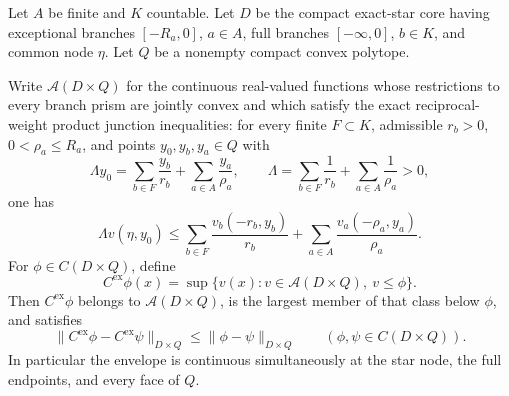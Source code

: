\begin{lemma}
\label{lem:p071-exact-star-polyhedral-envelope}
Let \(A\) be finite and \(K\) countable.  Let \(D\) be the compact exact-star
core having exceptional branches \([-R_a,0]\), \(a\in A\), full branches
\([-\infty,0]\), \(b\in K\), and common node \(\eta\).  Let \(Q\) be a
nonempty compact convex polytope.

Write \(\mathcal A(D\times Q)\) for the continuous real-valued functions
whose restrictions to every branch prism are jointly convex and which
satisfy the exact reciprocal-weight product junction inequalities: for every
finite \(F\subset K\), admissible \(r_b>0\), \(0<\rho_a\leq R_a\), and
points \(y_0,y_b,y_a\in Q\) with
\[
 \Lambda y_0=
   \sum_{b\in F}\frac{y_b}{r_b}
   +\sum_{a\in A}\frac{y_a}{\rho_a},
 \qquad
 \Lambda=\sum_{b\in F}\frac1{r_b}
            +\sum_{a\in A}\frac1{\rho_a}>0,
\]
one has
\[
 \Lambda v(\eta,y_0)\leq
   \sum_{b\in F}\frac{v_b(-r_b,y_b)}{r_b}
   +\sum_{a\in A}\frac{v_a(-\rho_a,y_a)}{\rho_a}.
\]
For \(\phi\in C(D\times Q)\), define
\begin{equation}
 C^{\mathrm{ex}}\phi(x)=
 \sup\{v(x):v\in\mathcal A(D\times Q),\ v\leq\phi\}.
 \label{eq:p071-exact-envelope-definition}
\end{equation}
Then \(C^{\mathrm{ex}}\phi\) belongs to
\(\mathcal A(D\times Q)\), is the largest member of that class below
\(\phi\), and satisfies
\begin{equation}
 \lVert C^{\mathrm{ex}}\phi-C^{\mathrm{ex}}\psi\rVert_{D\times Q}
 \leq \lVert\phi-\psi\rVert_{D\times Q}
 \qquad(\phi,\psi\in C(D\times Q)).
 \label{eq:p071-exact-envelope-nonexpanding}
\end{equation}
In particular the envelope is continuous simultaneously at the star node,
the full endpoints, and every face of \(Q\).
\end{lemma}

